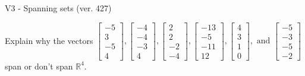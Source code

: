 \begin{exercise}
  \begin{exerciseTitle}V3 - Spanning sets (ver. 427)\end{exerciseTitle}
  \begin{exerciseStatement}
    Explain why the vectors \(\left[\begin{array}{r}
-5 \\
3 \\
-5 \\
4
\end{array}\right] , \left[\begin{array}{r}
-4 \\
-4 \\
-3 \\
4
\end{array}\right] , \left[\begin{array}{r}
2 \\
2 \\
-2 \\
-4
\end{array}\right] , \left[\begin{array}{r}
-13 \\
-5 \\
-11 \\
12
\end{array}\right] , \left[\begin{array}{r}
4 \\
3 \\
1 \\
0
\end{array}\right] , \text{ and } \left[\begin{array}{r}
-5 \\
-3 \\
-5 \\
-2
\end{array}\right]\) span or don't span \(\mathbb{R}^4\). 
	



\end{exerciseStatement}
\end{exercise}
